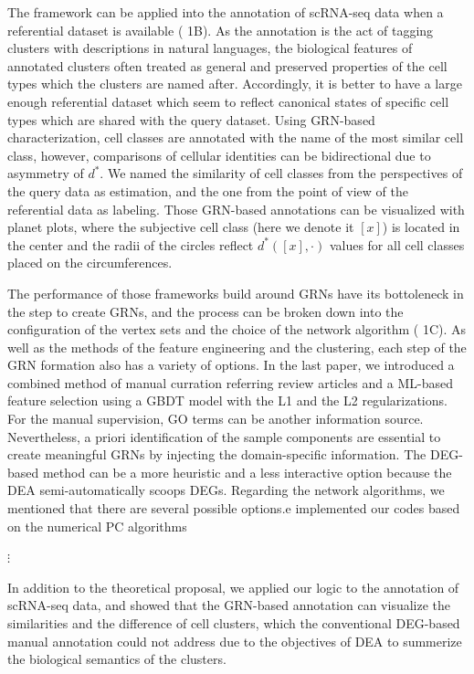 \documentclass{article}
\begin{document}
The framework can be applied into the annotation of scRNA-seq data when a referential dataset is available 
(\figurename{ 1B}). As the annotation is the act of tagging clusters with descriptions in natural languages, the biological 
features of annotated clusters often treated as general and preserved properties of the cell types which the clusters 
are named after. Accordingly, it is better to have a large enough referential dataset which seem to reflect canonical 
states of specific cell types which are shared with the query dataset. Using GRN-based characterization, cell classes 
are annotated with the name of the most similar cell class, however, comparisons of cellular identities can be 
bidirectional due to asymmetry of $d^*$. We named the similarity of cell classes from the perspectives of the query 
data as estimation, and the one from the point of view of the referential data as labeling. Those GRN-based 
annotations can be visualized with planet plots, where the subjective cell class (here we denote it $[x]$) is located in 
the center and the radii of the circles reflect $d^*([x],\cdot)$ values for all cell classes placed on the circumferences.

The performance of those frameworks build around GRNs have its bottoleneck in the step to create GRNs, and 
the process can be broken down into the configuration of the vertex sets and the choice of the network algorithm 
(\figurename{ 1C}). As well as the methods of the feature engineering and the clustering, each step of the GRN formation 
also has a variety of options. In the last paper, we introduced a combined method of manual curration referring 
review articles and a \ac{ML}-based feature selection using a \ac{GBDT} 
model with the L1 and the L2 regularizations\cite{okano2023set}. For the manual supervision, \ac{GO} terms can be 
another information source. Nevertheless, a priori identification of the sample components are essential to create 
meaningful GRNs by injecting the domain-specific information. The \ac{DEG}-based 
method can be a more heuristic and a less interactive option because the \ac{DEA} 
semi-automatically scoops DEGs. Regarding the network algorithms, we mentioned that there are several possible options.e implemented our codes based on the 
numerical PC algorithms

$\vdots$

In addition to the theoretical proposal, we applied our logic to 
the annotation of scRNA-seq data, and showed that the GRN-based annotation can visualize the similarities and the
difference of cell clusters, which the conventional \ac{DEG}-based manual annotation could not address due to the objectives of \ac{DEA} to summerize the biological semantics 
of the clusters.
\end{document}
